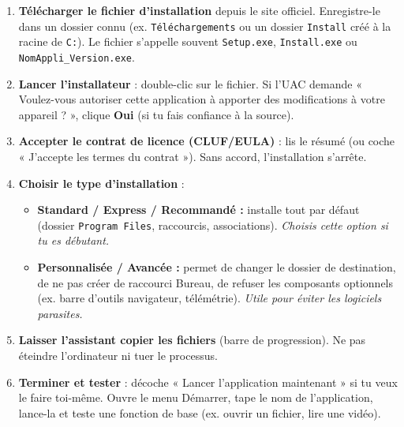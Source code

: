 \documentclass[11pt]{article}
\begin{document}
\begin{methode}
\begin{enumerate}
    \item \textbf{Télécharger le fichier d'installation} depuis le site officiel. Enregistre-le dans un dossier connu (ex. \texttt{Téléchargements} ou un dossier \texttt{Install} créé à la racine de \texttt{C:}). Le fichier s'appelle souvent \texttt{Setup.exe}, \texttt{Install.exe} ou \texttt{NomAppli\_Version.exe}.
    \item \textbf{Lancer l'installateur} : double-clic sur le fichier. Si l'UAC demande « Voulez-vous autoriser cette application à apporter des modifications à votre appareil ? », clique \textbf{Oui} (si tu fais confiance à la source).
    \item \textbf{Accepter le contrat de licence (CLUF/EULA)} : lis le résumé (ou coche « J'accepte les termes du contrat »). Sans accord, l'installation s'arrête.
    \item \textbf{Choisir le type d'installation} :
    \begin{itemize}
        \item \textbf{Standard / Express / Recommandé :} installe tout par défaut (dossier \texttt{Program Files}, raccourcis, associations). \emph{Choisis cette option si tu es débutant.}
        \item \textbf{Personnalisée / Avancée :} permet de changer le dossier de destination, de ne pas créer de raccourci Bureau, de refuser les composants optionnels (ex. barre d'outils navigateur, télémétrie). \emph{Utile pour éviter les logiciels parasites.}
    \end{itemize}
    \item \textbf{Laisser l'assistant copier les fichiers} (barre de progression). Ne pas éteindre l'ordinateur ni tuer le processus.
    \item \textbf{Terminer et tester} : décoche « Lancer l'application maintenant » si tu veux le faire toi-même. Ouvre le menu Démarrer, tape le nom de l'application, lance-la et teste une fonction de base (ex. ouvrir un fichier, lire une vidéo).
\end{enumerate}
\end{methode}
\end{document}
